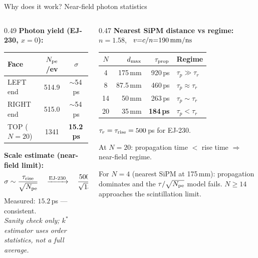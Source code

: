 \documentclass[aspectratio=169,9pt]{beamer}
\begin{document}
\begin{frame}{Why does it work? Near-field photon statistics}
\begin{columns}[T]
\begin{column}{0.49\textwidth}
\textbf{Photon yield (EJ-230, $x{=}0$):}\\[0.2em]
\footnotesize
\renewcommand{\arraystretch}{1.15}
\begin{tabular}{lcc}
\toprule
Face & $N_{\rm pe}$/ev & $\sigma$\\
\midrule
LEFT end  & 514.9 & $\sim$54\,ps\\
RIGHT end & 515.0 & $\sim$54\,ps\\
\rowcolor{rowbest}
TOP ($N{=}20$) & 1341 & \textbf{15.2\,ps}\\
\bottomrule
\end{tabular}

\vspace{0.5em}
\normalsize
\textbf{Scale estimate (near-field limit):}
\[
\sigma \sim \frac{\tau_{\rm rise}}{\sqrt{N_{\rm pe}}}
\quad\xrightarrow{{\rm EJ\text{-}230}}\quad
\frac{500\,{\rm ps}}{\sqrt{1341}} = 13.7\,{\rm ps}
\]
\footnotesize
Measured: $15.2$\,ps — consistent.\\[0.2em]
\textit{Sanity check only; $k^*$ estimator uses order statistics, not a full average.}
\end{column}

\begin{column}{0.47\textwidth}
\textbf{Nearest SiPM distance vs regime:}\\[0.2em]
\footnotesize
$n{=}1.58$, \ $v{=}c/n{=}190\,{\rm mm/ns}$

\vspace{0.2em}
\renewcommand{\arraystretch}{1.2}
\setlength{\tabcolsep}{5pt}
\begin{tabular}{crrl}
\toprule
$N$ & $d_{\rm max}$ & $\tau_{\rm prop}$ & Regime\\
\midrule
4  & 175\,mm & 920\,ps & $\tau_p \gg \tau_r$\\
8  & 87.5\,mm & 460\,ps & $\tau_p \approx \tau_r$\\
14 &  50\,mm & 263\,ps & $\tau_p \sim \tau_r$\\
\rowcolor{rowbest}
20 &  35\,mm & \textbf{184\,ps} & $\tau_p < \tau_r$\\
\bottomrule
\end{tabular}

\vspace{0.3em}
\normalsize
$\tau_r = \tau_{\rm rise} = 500$\,ps for EJ-230.

\vspace{0.4em}
At $N{=}20$: propagation time $<$ rise time
$\Rightarrow$ near-field regime.

\vspace{0.4em}
\footnotesize
For $N{=}4$ (nearest SiPM at 175\,mm): propagation
dominates and the $\tau/\sqrt{N_{\rm pe}}$ model fails.
$N{\geq}14$ approaches the scintillation limit.
\end{column}
\end{columns}
\end{frame}
\end{document}
